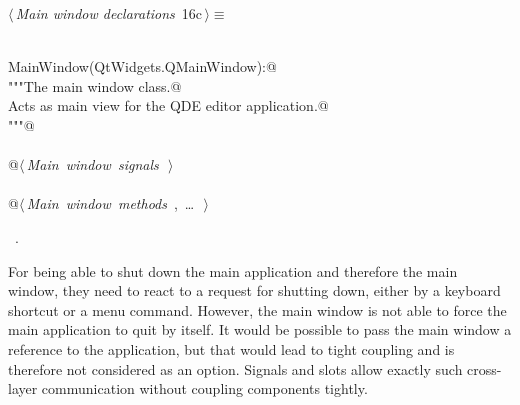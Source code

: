 \documentclass[
    a4paper,      %
    10pt,         %
    openright,    %
    notitlepage,  %
    parskip=half, %
]{scrreprt}       %
\theoremstyle{definition}                    %
\begin{document}
\begin{flushleft} \small
\begin{minipage}{\linewidth}\label{scrap5}\raggedright\small
{} $\langle\,${\itshape Main window declarations}\nobreak\ {\footnotesize {16c}}$\,\rangle\equiv$
\vspace{-1ex}
\begin{list}{}{} \item
\mbox{}\lstinline@@\\
\mbox{}\lstinline@class MainWindow(QtWidgets.QMainWindow):@\\
\mbox{}\lstinline@    """The main window class.@\\
\mbox{}\lstinline@    Acts as main view for the QDE editor application.@\\
\mbox{}\lstinline@    """@\\
\mbox{}\lstinline@@\\
\mbox{}\lstinline@    @\hbox{$\langle\,${\itshape Main window signals}\nobreak\ {\footnotesize {}}$\,\rangle$}\lstinline@@\\
\mbox{}\lstinline@@\\
\mbox{}\lstinline@    @\hbox{$\langle\,${\itshape Main window methods}\nobreak\ {\footnotesize {}, \ldots\ }$\,\rangle$}\lstinline@@\\
\mbox{}\lstinline@@{\NWsep}
\end{list}
\vspace{-1.5ex}
\footnotesize
\begin{list}{}{\setlength{\itemsep}{-\parsep}\setlength{\itemindent}{-\leftmargin}}
\item \NWtxtMacroRefIn\ .

\item{}
\end{list}
\end{minipage}\vspace{4ex}
\end{flushleft}
% 

For being able to shut down the main application and therefore the main window,
they need to react to a request for shutting down, either by a keyboard shortcut
or a menu command. However, the main window is not able to force the main
application to quit by itself. It would be possible to pass the main window a
reference to the application, but that would lead to tight coupling and is
therefore not considered as an option. Signals and slots allow exactly such
cross-layer communication without coupling components tightly.
\end{document}
